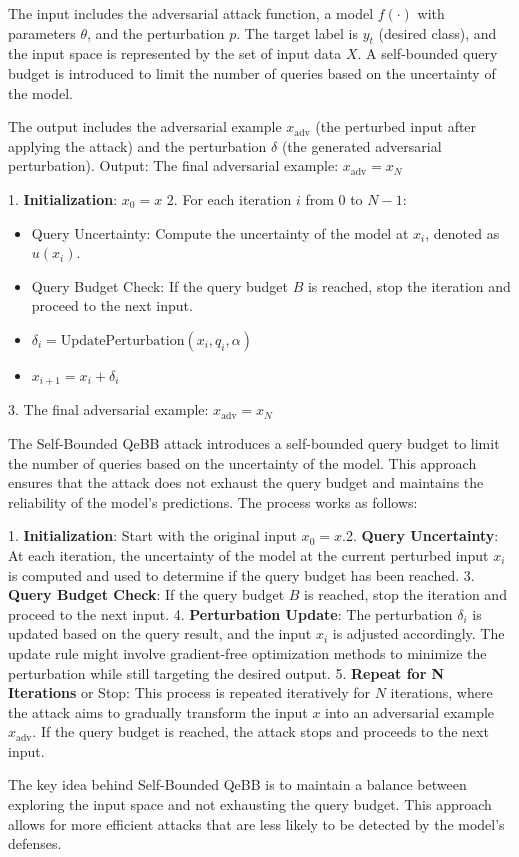 The input includes the adversarial attack function, a model $f(\cdot)$ with parameters $\theta$, and the perturbation $p$. 
The target label is $y_t$ (desired class), and the input space is represented by the set of input data $X$. 
A self-bounded query budget is introduced to limit the number of queries based on the uncertainty of the model.

The output includes the adversarial example $x_{\text{adv}}$ (the perturbed input after applying the attack) and the perturbation $\delta$ (the generated adversarial perturbation).
Output: The final adversarial example:
$x_{\text{adv}} = x_N$

1. \textbf{Initialization}:
   $x_0 = x$
2. For each iteration $i$ from 0 to $N-1$:
   \begin{itemize}
   \item Query Uncertainty: Compute the uncertainty of the model at $x_i$, denoted as $u(x_i)$.
   \item Query Budget Check: If the query budget $B$ is reached, stop the iteration and proceed to the next input.
   \item $\delta_i = \text{UpdatePerturbation}(x_i, q_i, \alpha)$
   \item $x_{i+1} = x_i + \delta_i$
   \end{itemize}
3. The final adversarial example:
$x_{\text{adv}} = x_N$

The Self-Bounded QeBB attack introduces a self-bounded query budget to limit the number of queries based on the uncertainty of the model. This approach ensures that the attack does not exhaust the query budget and maintains the reliability of the model's predictions. The process works as follows:

1. \textbf{Initialization}: Start with the original input $x_0 = x$.2. \textbf{Query Uncertainty}: At each iteration, the uncertainty of the model at the current perturbed input $x_i$ is computed and used to determine if the query budget has been reached.
3. \textbf{Query Budget Check}: If the query budget $B$ is reached, stop the iteration and proceed to the next input.
4. \textbf{Perturbation Update}: The perturbation $\delta_i$ is updated based on the query result, and the input $x_i$ is adjusted accordingly. The update rule might involve gradient-free optimization methods to minimize the perturbation while still targeting the desired output.
5. \textbf{Repeat for N Iterations} or Stop: This process is repeated iteratively for $N$ iterations, where the attack aims to gradually transform the input $x$ into an adversarial example $x_{\text{adv}}$. If the query budget is reached, the attack stops and proceeds to the next input.

The key idea behind Self-Bounded QeBB is to maintain a balance between exploring the input space and not exhausting the query budget. This approach allows for more efficient attacks that are less likely to be detected by the model's defenses.